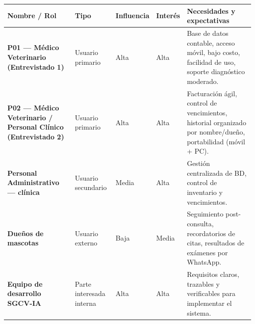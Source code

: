 \documentclass[
]{article}
\newcounter{none} %
\begin{document}
{\def\LTcaptype{none} %
\begin{longtable}[]{|
  >{\raggedright\arraybackslash}p{}|
  >{\raggedright\arraybackslash}p{}|
  >{\centering\arraybackslash}p{}|
  >{\centering\arraybackslash}p{}|
  >{\raggedright\arraybackslash}p{}|}
\hline
\begin{minipage}[b]{\linewidth}\raggedright
\textbf{Nombre / Rol}
\end{minipage} & \begin{minipage}[b]{\linewidth}\centering
\textbf{Tipo}
\end{minipage} & \begin{minipage}[b]{\linewidth}\centering
\textbf{Influencia}
\end{minipage} & \begin{minipage}[b]{\linewidth}\centering
\textbf{Interés}
\end{minipage} & \begin{minipage}[b]{\linewidth}\raggedright
\textbf{Necesidades y expectativas}
\end{minipage} \\
\hline
\endhead
\hline
\endlastfoot
\textbf{P01 --- Médico Veterinario (Entrevistado 1)} &
\begin{minipage}[t]{\linewidth}\raggedright
Usuario primario
\end{minipage} & Alta & Alta & Base de datos contable, acceso móvil,
bajo costo, facilidad de uso, soporte diagnóstico moderado. \\
\hline
\textbf{P02 --- Médico Veterinario / Personal Clínico (Entrevistado
2)} & \begin{minipage}[t]{\linewidth}\raggedright
Usuario primario
\end{minipage} & Alta & Alta & Facturación ágil, control de
vencimientos, historial organizado por nombre/dueño, portabilidad (móvil + PC). \\
\hline
\textbf{Personal Administrativo --- clínica} &
\begin{minipage}[t]{\linewidth}\raggedright
Usuario secundario
\end{minipage} & Media & Alta & Gestión centralizada de BD, control de
inventario y vencimientos. \\
\hline
\textbf{Dueños de mascotas} &
\begin{minipage}[t]{\linewidth}\raggedright
Usuario externo
\end{minipage} & Baja & Media & Seguimiento post-consulta, recordatorios
de citas, resultados de exámenes por WhatsApp. \\
\hline
\textbf{Equipo de desarrollo SGCV-IA} &
\begin{minipage}[t]{\linewidth}\raggedright
Parte interesada interna
\end{minipage} & Alta & Alta & Requisitos claros, trazables y
verificables para implementar el sistema. \\
\hline
\end{longtable}
}
\end{document}
